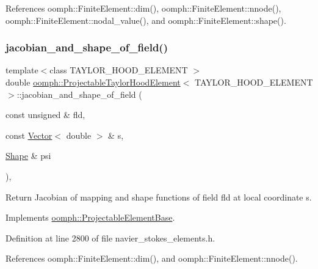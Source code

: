 References oomph\+::\+Finite\+Element\+::dim(), oomph\+::\+Finite\+Element\+::nnode(), oomph\+::\+Finite\+Element\+::nodal\+\_\+value(), and oomph\+::\+Finite\+Element\+::shape().

\mbox{\label{classoomph_1_1ProjectableTaylorHoodElement_a1893ca2bf9bf81d12350b9534cbf30d8}} 
\subsubsection{\texorpdfstring{jacobian\+\_\+and\+\_\+shape\+\_\+of\+\_\+field()}{jacobian\_and\_shape\_of\_field()}}
{\footnotesize\ttfamily template$<$class T\+A\+Y\+L\+O\+R\+\_\+\+H\+O\+O\+D\+\_\+\+E\+L\+E\+M\+E\+NT $>$ \\
double \hyperlink{classoomph_1_1ProjectableTaylorHoodElement}{oomph\+::\+Projectable\+Taylor\+Hood\+Element}$<$ T\+A\+Y\+L\+O\+R\+\_\+\+H\+O\+O\+D\+\_\+\+E\+L\+E\+M\+E\+NT $>$\+::jacobian\+\_\+and\+\_\+shape\+\_\+of\+\_\+field (\begin{DoxyParamCaption}\item[{const unsigned \&}]{fld,  }\item[{const \hyperlink{classoomph_1_1Vector}{Vector}$<$ double $>$ \&}]{s,  }\item[{\hyperlink{classoomph_1_1Shape}{Shape} \&}]{psi }\end{DoxyParamCaption})\hspace{0.3cm}{\ttfamily [inline]}, {\ttfamily [virtual]}}



Return Jacobian of mapping and shape functions of field fld at local coordinate s. 



Implements \hyperlink{classoomph_1_1ProjectableElementBase_ad45c21b58c0985d52f68ab2d79cbb488}{oomph\+::\+Projectable\+Element\+Base}.



Definition at line 2800 of file navier\+\_\+stokes\+\_\+elements.\+h.



References oomph\+::\+Finite\+Element\+::dim(), and oomph\+::\+Finite\+Element\+::nnode().

